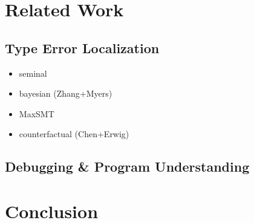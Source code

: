 \documentclass[10pt,pldi,nocopyrightspace,indentedstyle=false]{sigplanconf-pldi15}
\theoremstyle{plain}%
\theoremstyle{definition}
\begin{document}


\section{Related Work}              %

\subsection{Type Error Localization}
\label{sec:type-error-local}
\begin{itemize}
\item seminal
\item bayesian (Zhang+Myers)
\item MaxSMT
\item counterfactual (Chen+Erwig)
\end{itemize}
\subsection{Debugging \& Program Understanding}
\label{sec:debugging}



\section{Conclusion}                %
\end{document}
